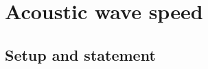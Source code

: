 \documentclass[preprint,12pt]{elsarticle}
\begin{document}
%
%
%
%
%
%
%
%
%
%
%
%
%


\section{Acoustic wave speed}
\label{sec:theorem}

\subsection{Setup and statement}
\label{sec:setup}
\end{document}
